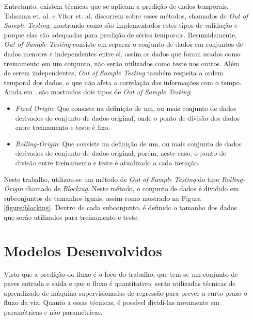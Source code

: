 Entretanto, existem técnicas que se aplicam a predição de dados temporais. Tahsman et. al. \cite{Tashman_2000} e Vitor et. al. \cite{Vitor_2019} discorrem sobre esses métodos, chamados de \textit{Out of Sample Testing}, mostrando como são implementados estes tipos de validação e porque elas são adequadas para predição de séries temporais. Resumidamente, \textit{Out of Sample Testing} consiste em separar o conjunto de dados em conjuntos de dados menores e independentes entre si, assim os dados que foram usados como treinamento em um conjunto, não serão utilizados como teste nos outros. Além de serem independentes, \textit{Out of Sample Testing} também respeita a ordem temporal dos dados, o que não afeta a correlação das informações com o tempo. Ainda em \cite{Tashman_2000}, são mostrados dois tipos de \textit{Out of Sample Testing}:

\begin{itemize}
    \item \textit{Fixed Origin}: Que consiste na definição de um, ou mais conjunto de dados derivados do conjunto de dados original, onde o ponto de divisão dos dados entre treinamento e teste é fixo.
    \item \textit{Rolling-Origin}: Que consiste na definição de um, ou mais conjunto de dados derivados do conjunto de dados original, porém, neste caso, o ponto de divisão entre treinamento e teste é atualizado a cada iteração.
\end{itemize}

Neste trabalho, utilizou-se um método de \textit{Out of Sample Testing} do tipo \textit{Rolling-Origin} chamado de \textit{Blocking}. Neste método, o conjunto de dados é dividido em subconjuntos de tamanhos iguais, assim como mostrado na Figura \ref{figure:blocking}. Dentro de cada subconjunto, é definido o tamanho dos dados que serão utilizados para treinamento e teste.

\section{Modelos Desenvolvidos}

Visto que a predição do fluxo é o foco do trabalho, que tem-se um conjunto de pares entrada e saída e que o fluxo é quantitativo, serão utilizadas técnicas de aprendizado de máquina supervisionadas de regressão para prever a curto prazo o fluxo da via. Quanto a essas técnicas, é possível dividi-las novamente em paramétricas e não paramétricas.

